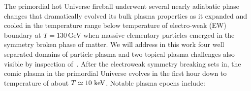 The primordial hot Universe fireball underwent several nearly adiabatic phase changes that dramatically evolved its bulk plasma properties as it expanded and cooled in the temperature range below temperature of electro-weak (EW) boundary at $T=130$\,GeV when massive elementary particles emerged in the symmetry broken phase of matter. We will address in this work four well separated domains of particle plasma and two topical plasma challenges also visible by inspection of~. After the electroweak symmetry breaking sets in, the comic plasma in the primordial Universe evolves in the first hour down to temperature of about $T\simeq 10\text{ keV}$. Notable plasma epochs include: 
